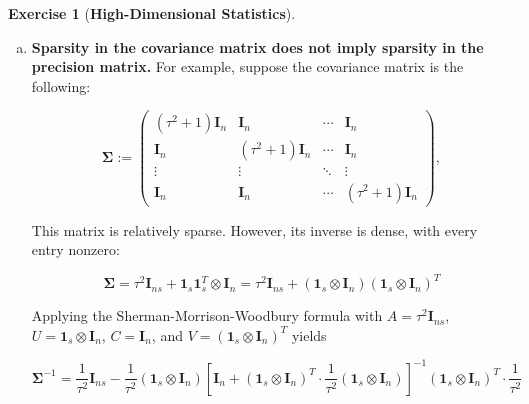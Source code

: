\documentclass{article}
\theoremstyle{definition}
\newtheorem{exercise}{Exercise}
\theoremstyle{definition}
\newtheorem{theorem}{Theorem}
\theoremstyle{definition}
\theoremstyle{definition}
\begin{document}
\begin{exercise}[\textbf{High-Dimensional Statistics}]

\begin{enumerate}[(a)]

\item \textbf{Sparsity in the covariance matrix does not imply sparsity in the precision matrix.} For example, suppose the covariance matrix is the following:

\[
\boldsymbol{\Sigma} := \begin{pmatrix}
(\tau^2  + 1) \boldsymbol{I}_n &  \boldsymbol{I}_n & \cdots & \boldsymbol{I}_n \\
\boldsymbol{I}_n  & (\tau^2 + 1)  \boldsymbol{I}_n  & \cdots &  \boldsymbol{I}_n \\
\vdots & \vdots &  \ddots & \vdots \\
\boldsymbol{I}_n & \boldsymbol{I}_n  &  \cdots & (\tau^2 + 1) \boldsymbol{I}_n
\end{pmatrix},
\]

This matrix is relatively sparse. However, its inverse is dense, with every entry nonzero:

\[
\boldsymbol{\Sigma} = \tau^2 \boldsymbol{I}_{ns} + \boldsymbol{1}_s\boldsymbol{1}_s^T \otimes \boldsymbol{I}_n =  \tau^2 \boldsymbol{I}_{ns} + \left(\boldsymbol{1}_s \otimes \boldsymbol{I}_n\right)\left(\boldsymbol{1}_s \otimes \boldsymbol{I}_n\right)^T
\]

Applying the Sherman-Morrison-Woodbury formula  with \(A = \tau^2 \boldsymbol{I}_{ns}\), \(U = \boldsymbol{1}_s \otimes \boldsymbol{I}_n\), \(C = \boldsymbol{I}_n \), and \(V = (\boldsymbol{1}_s \otimes \boldsymbol{I}_n) ^T\) yields

%
%

\[
\boldsymbol{\Sigma}^{-1} = \frac{1}{\tau^2} \boldsymbol{I}_{ns} - \frac{1}{\tau^2} (\boldsymbol{1}_s \otimes \boldsymbol{I}_n) \left[ \boldsymbol{I}_n + (\boldsymbol{1}_s \otimes \boldsymbol{I}_n)^T \cdot \frac{1}{\tau^2} (\boldsymbol{1}_s \otimes \boldsymbol{I}_n) \right]^{-1}(\boldsymbol{1}_s \otimes \boldsymbol{I}_n)^T \cdot \frac{1}{\tau^2}
\] 


\end{enumerate}
\end{exercise}
\end{document}
